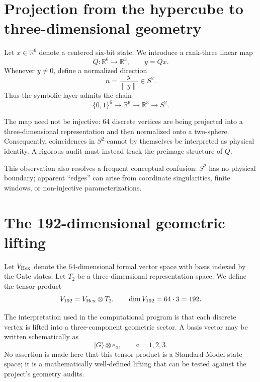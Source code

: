 \documentclass[11pt,a4paper]{article}
\numberwithin{equation}{section}
\newcommand{\R}{\mathbb{R}}
\begin{document}
\section{Projection from the hypercube to three-dimensional geometry}
\label{sec:projection}

Let $x\in\R^6$ denote a centered six-bit state. We introduce a rank-three linear map
\begin{equation}
Q:\R^6\rightarrow\R^3,
\qquad y=Qx.
\end{equation}
Whenever $y\ne0$, define a normalized direction
\begin{equation}
 n=\frac{y}{\|y\|}\in S^2.
\label{eq:spherical-map}
\end{equation}
Thus the symbolic layer admits the chain
\begin{equation}
 \{0,1\}^6\rightarrow\R^6\rightarrow\R^3\rightarrow S^2.
\end{equation}

The map need not be injective: 64 discrete vertices are being projected into a three-dimensional representation and then normalized onto a two-sphere. Consequently, coincidences in $S^2$ cannot by themselves be interpreted as physical identity. A rigorous audit must instead track the preimage structure of $Q$.

This observation also resolves a frequent conceptual confusion: $S^2$ has no physical boundary; apparent ``edges'' can arise from coordinate singularities, finite windows, or non-injective parameterizations.

\section{The 192-dimensional geometric lifting}
\label{sec:192}

Let $V_{\rm Hex}$ denote the 64-dimensional formal vector space with basis indexed by the Gate states. Let $T_2$ be a three-dimensional representation space. We define the tensor product
\begin{equation}
V_{192}=V_{\rm Hex}\otimes T_2,
\qquad
\dim V_{192}=64\cdot3=192.
\label{eq:V192}
\end{equation}

The interpretation used in the computational program is that each discrete vertex is lifted into a three-component geometric sector. A basis vector may be written schematically as
\[
|G\rangle\otimes e_a,
\qquad a=1,2,3.
\]
No assertion is made here that this tensor product is a Standard Model state space; it is a mathematically well-defined lifting that can be tested against the project's geometry audits.
\end{document}
